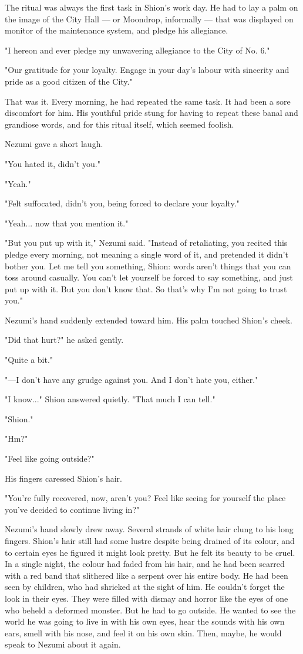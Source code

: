 The ritual was always the first task in Shion's work day. He had to lay
a palm on the image of the City Hall --- or Moondrop, informally --- that
was displayed on monitor of the maintenance system, and pledge his
allegiance.

"I hereon and ever pledge my unwavering allegiance to the City of No.
6."

"Our gratitude for your loyalty. Engage in your day's labour with
sincerity and pride as a good citizen of the City."

That was it. Every morning, he had repeated the same task. It had been a
sore discomfort for him. His youthful pride stung for having to repeat
these banal and grandiose words, and for this ritual itself, which
seemed foolish.

Nezumi gave a short laugh.

"You hated it, didn't you."

"Yeah."

"Felt suffocated, didn't you, being forced to declare your loyalty."

"Yeah... now that you mention it."

"But you put up with it," Nezumi said. "Instead of retaliating, you
recited this pledge every morning, not meaning a single word of it, and
pretended it didn't bother you. Let me tell you something, Shion: words
aren't things that you can toss around casually. You can't let yourself
be forced to say something, and just put up with it. But you don't know
that. So that's why I'm not going to trust you."

Nezumi's hand suddenly extended toward him. His palm touched Shion's
cheek.

"Did that hurt?" he asked gently.

"Quite a bit."

"---I don't have any grudge against you. And I don't hate you, either."

"I know..." Shion answered quietly. "That much I can tell."

"Shion."

"Hm?"

"Feel like going outside?"

His fingers caressed Shion's hair.

"You're fully recovered, now, aren't you? Feel like seeing for yourself
the place you've decided to continue living in?"

Nezumi's hand slowly drew away. Several strands of white hair clung to
his long fingers. Shion's hair still had some lustre despite being
drained of its colour, and to certain eyes he figured it might look
pretty. But he felt its beauty to be cruel. In a single night, the
colour had faded from his hair, and he had been scarred with a red band
that slithered like a serpent over his entire body. He had been seen by
children, who had shrieked at the sight of him. He couldn't forget the
look in their eyes. They were filled with dismay and horror like the
eyes of one who beheld a deformed monster. But he had to go outside. He
wanted to see the world he was going to live in with his own eyes, hear
the sounds with his own ears, smell with his nose, and feel it on his
own skin. Then, maybe, he would speak to Nezumi about it again.

